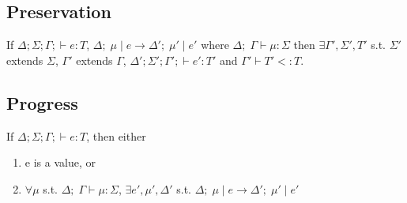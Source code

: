 \documentclass{llncs}
\begin{document}
\subsection{Preservation}


\begin{theorem}
If $ \Delta; \Sigma; \Gamma;  \vdash e : T$, 
   	$\Delta; \; \mu \; | \; e \rightarrow \Delta'; \; \mu' \; | \; e'$ where
	$\Delta; \; \Gamma \vdash \mu : \Sigma$ then 
 	$\exists \Gamma', \Sigma', T'$ s.t. 
	$\Sigma'$ extends $\Sigma$,
	$\Gamma'$ extends $\Gamma$,
	$\Delta'; \Sigma'; \Gamma';  \vdash e' : T'$
	and $\Gamma' \vdash T'<:T$.
\end{theorem}

\subsection{Progress}
\begin{theorem}[Progress]
If $\Delta; \Sigma; \Gamma;  \vdash e : T$, then either
\begin{enumerate}
\item e is a value, or
\item $\forall \mu$ s.t.
		   $\Delta; \; \Gamma \vdash \mu : \Sigma$,
         $\exists e', \mu', \Delta'$ s.t. 
         $\Delta; \; \mu \; | \; e \rightarrow \Delta'; \; \mu' \; | \; e'$
\end{enumerate}
\end{theorem}
\end{document}
